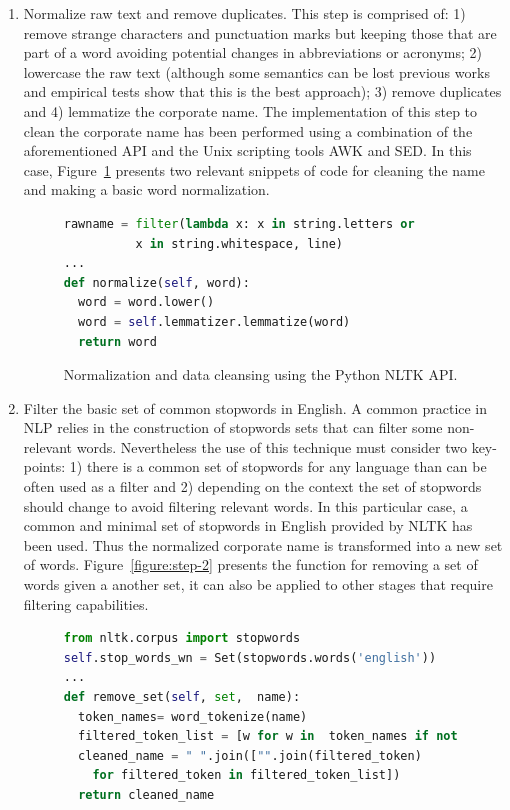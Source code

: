 \documentclass[1p,12pt]{elsarticle}
\begin{document}
\begin{enumerate}
 \item Normalize raw text and remove duplicates. This step is comprised of: 1) remove strange characters and punctuation marks but keeping 
 those that are part of a word avoiding potential changes in  abbreviations or acronyms; 2) lowercase the raw text (although some semantics can 
 be lost previous works and empirical tests show that this is the best approach); 3) remove duplicates and 4) lemmatize the corporate name. 
 The implementation of this step to clean the corporate name has been performed using a combination of the aforementioned API and 
 the Unix scripting tools AWK and SED. In this case, Figure~\ref{figure:step-1} presents 
 two relevant snippets of code for cleaning the name and making a basic word normalization. 
 
\begin{figure}[!h]
\begin{center}
\begin{lstlisting}[language=Python]        
rawname = filter(lambda x: x in string.letters or 
	      x in string.whitespace, line)
...
def normalize(self, word):
  word = word.lower()
  word = self.lemmatizer.lemmatize(word)
  return word
\end{lstlisting}
\caption{Normalization and data cleansing using the Python NLTK API.}
\label{figure:step-1}
\end{center}
\end{figure}

  

\item Filter the basic set of common stopwords in English. A common practice in NLP relies in the construction 
of stopwords sets that can filter some non-relevant words. Nevertheless the use of this technique must 
consider two key-points: 1) there is a common set of stopwords for any language than can be often used as a filter and 
2) depending on the context the set of stopwords should change to avoid filtering relevant words. In this particular 
case, a common and minimal set of stopwords in English provided by NLTK has been used. Thus the normalized corporate name is 
transformed into a new set of words. Figure~\ref{figure:step-2} presents the function for removing a set of 
words given a another set, it can also be applied to other stages that require filtering capabilities.

\begin{figure}[!h]
\begin{center}
\begin{lstlisting}[language=Python] 
from nltk.corpus import stopwords
self.stop_words_wn = Set(stopwords.words('english'))
...
def remove_set(self, set,  name): 
  token_names= word_tokenize(name)       
  filtered_token_list = [w for w in  token_names if not w in set ]
  cleaned_name = " ".join(["".join(filtered_token) 
    for filtered_token in filtered_token_list])
  return cleaned_name
  

\end{lstlisting}
\end{center}
\end{figure}
\end{enumerate}
\end{document}
